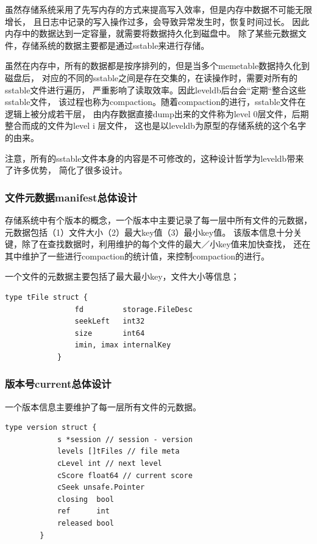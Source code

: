 		虽然存储系统采用了先写内存的方式来提高写入效率，但是内存中数据不可能无限增长，
		且日志中记录的写入操作过多，会导致异常发生时，恢复时间过长。
		因此内存中的数据达到一定容量，就需要将数据持久化到磁盘中。
		除了某些元数据文件，存储系统的数据主要都是通过sstable来进行存储。

		虽然在内存中，所有的数据都是按序排列的，但是当多个memetable数据持久化到磁盘后，
		对应的不同的sstable之间是存在交集的，在读操作时，需要对所有的sstable文件进行遍历，
		严重影响了读取效率。因此leveldb后台会“定期“整合这些sstable文件，
		该过程也称为compaction。随着compaction的进行，sstable文件在逻辑上被分成若干层，
		由内存数据直接dump出来的文件称为level 0层文件，后期整合而成的文件为level i 层文件，
		这也是以leveldb为原型的存储系统的这个名字的由来。

		注意，所有的sstable文件本身的内容是不可修改的，这种设计哲学为leveldb带来了许多优势，
		简化了很多设计。

		\subsubsection{文件元数据manifest总体设计}

		存储系统中有个版本的概念，一个版本中主要记录了每一层中所有文件的元数据，
		元数据包括（1）文件大小（2）最大key值（3）最小key值。
		该版本信息十分关键，除了在查找数据时，利用维护的每个文件的最大／小key值来加快查找，
		还在其中维护了一些进行compaction的统计值，来控制compaction的进行。

		一个文件的元数据主要包括了最大最小key，文件大小等信息；
		
		\begin{lstlisting}[caption=tFile , label=code_radds_storage_tfile]
			type tFile struct {
    			fd         storage.FileDesc
    			seekLeft   int32
    			size       int64
    			imin, imax internalKey
			}
		\end{lstlisting}

		\subsubsection{版本号current总体设计}

		一个版本信息主要维护了每一层所有文件的元数据。
		\begin{lstlisting}[caption=tFile , label=code_radds_storage_tfile]
		type version struct {
    		s *session // session - version
    		levels []tFiles // file meta
    		cLevel int // next level
    		cScore float64 // current score
    		cSeek unsafe.Pointer
    		closing  bool
    		ref      int
    		released bool
		}
		\end{lstlisting}

